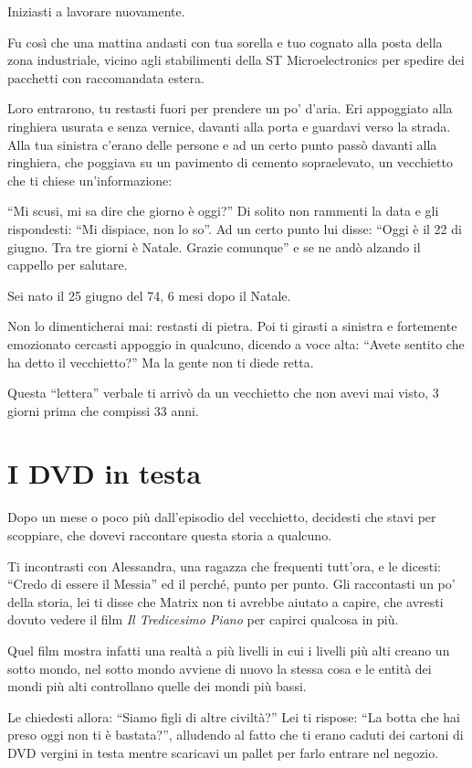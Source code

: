 Iniziasti a lavorare nuovamente.

Fu così che una mattina andasti con tua sorella e tuo cognato alla posta della zona industriale, vicino agli stabilimenti della ST Microelectronics per spedire dei pacchetti con raccomandata estera.

Loro entrarono, tu restasti fuori per prendere un po' d'aria. Eri appoggiato alla ringhiera usurata e senza vernice, davanti alla porta e guardavi verso la strada. Alla tua sinistra c'erano delle persone e ad un certo punto passò davanti alla ringhiera, che poggiava su un pavimento di cemento sopraelevato, un vecchietto che ti chiese un'informazione:

“Mi scusi, mi sa dire che giorno è oggi?” Di solito non rammenti la data e gli rispondesti: “Mi dispiace, non lo so”. Ad un certo punto lui disse: “Oggi è il 22 di giugno. Tra tre giorni è Natale. Grazie comunque” e se ne andò alzando il cappello per salutare.

Sei nato il 25 giugno del 74, 6 mesi dopo il Natale.

Non lo dimenticherai mai: restasti di pietra. Poi ti girasti a sinistra e fortemente emozionato cercasti appoggio in qualcuno, dicendo a voce alta: “Avete sentito che ha detto il vecchietto?” Ma la gente non ti diede retta.

Questa ``lettera'' verbale ti arrivò da un vecchietto che non avevi mai visto, 3 giorni prima che compissi 33 anni.

\section{I DVD in testa}
\label{dvd_in_testa}

Dopo un mese o poco più dall'episodio del vecchietto, decidesti che stavi per scoppiare, che dovevi raccontare questa storia a qualcuno.

Ti incontrasti con Alessandra, una ragazza che frequenti tutt'ora, e le dicesti: “Credo di essere il Messia” ed il perché, punto per punto. Gli raccontasti un po' della storia, lei ti disse che Matrix non ti avrebbe aiutato a capire, che avresti dovuto vedere il film \textit{Il Tredicesimo Piano} per capirci qualcosa in più.

Quel film mostra infatti una realtà a più livelli in cui i livelli più alti creano un sotto mondo, nel sotto mondo avviene di nuovo la stessa cosa e le entità dei mondi più alti controllano quelle dei mondi più bassi.

Le chiedesti allora: “Siamo figli di altre civiltà?” Lei ti rispose: “La botta che hai preso oggi non ti è bastata?”, alludendo al fatto che ti erano caduti dei cartoni di DVD vergini in testa mentre scaricavi un pallet per farlo entrare nel negozio.
